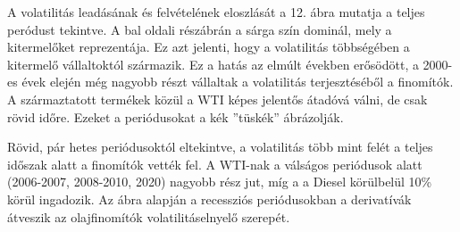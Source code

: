 \documentclass[12pt,bibliography=totoc]{article}
\begin{document}

A volatilitás leadásának és felvételének eloszlását a 12. ábra mutatja a teljes peródust tekintve. A bal oldali részábrán a sárga szín dominál, mely a kitermelőket reprezentája. Ez azt jelenti, hogy a volatilitás többségében a kitermelő vállaltoktól származik. Ez a hatás az elmúlt években erősödött, a 2000-es évek elején még nagyobb részt vállaltak a volatilitás terjesztéséből a finomítók. A származtatott termékek közül a WTI képes jelentős átadóvá válni, de csak rövid időre. Ezeket a periódusokat a kék ''tüskék'' ábrázolják.

Rövid, pár hetes periódusoktól eltekintve, a volatilitás több mint felét a teljes időszak alatt a finomítók vették fel. A WTI-nak a válságos periódusok alatt (2006-2007, 2008-2010, 2020) nagyobb rész jut, míg a a Diesel körülbelül 10\% körül ingadozik. Az ábra alapján a recessziós periódusokban a derivatívák átveszik az olajfinomítók volatilitáselnyelő szerepét.
\end{document}
